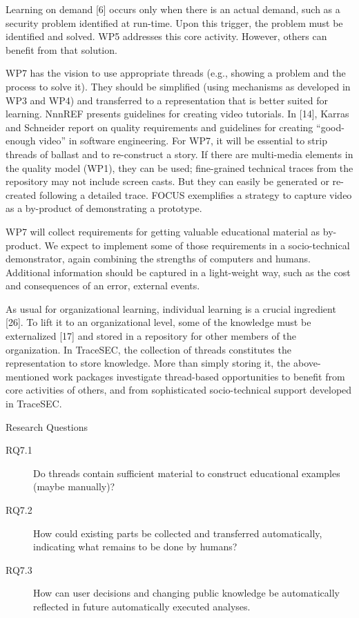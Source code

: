 Learning on demand [6] occurs only when there is an actual demand, such as a security problem identified at run-time. Upon this trigger, the problem must be identified and solved. WP5 addresses this core activity. However, others can benefit from that solution.

WP7 has the vision to use appropriate threads (e.g., showing a problem and the process to solve it). They should be simplified (using mechanisms as developed in WP3 and WP4) and transferred to a representation that is better suited for learning. NnnREF presents guidelines for creating video tutorials. In [14], Karras and Schneider report on quality requirements and guidelines for creating “good-enough video” in software engineering. For WP7, it will be essential to strip threads of ballast and to re-construct a story. If there are multi-media elements in the quality model (WP1), they can be used; fine-grained technical traces from the repository may not include screen casts. But they can easily be generated or re-created following a detailed trace. FOCUS exemplifies a strategy to capture video as a by-product of demonstrating a prototype. 

WP7 will collect requirements for getting valuable educational material as by-product. We expect to implement some of those requirements in a socio-technical demonstrator, again combining the strengths of computers and humans. Additional information should be captured in a light-weight way, such as the cost and consequences of an error, external events.

As usual for organizational learning, individual learning is a crucial ingredient [26]. To lift it to an organizational level, some of the knowledge must be externalized [17] and stored in a repository for other members of the organization. In TraceSEC, the collection of threads constitutes the representation to store knowledge. More than simply storing it, the above-mentioned work packages investigate thread-based opportunities to benefit from core activities of others, and from sophisticated socio-technical support developed in TraceSEC.

Research Questions
\begin{description}
	\item[RQ7.1]	Do threads contain sufficient material to construct educational examples (maybe manually)?
	\item[RQ7.2]	How could existing parts be collected and transferred automatically, indicating what remains to be done by humans?
	\item[RQ7.3]	How can user decisions and changing public knowledge be automatically reflected in future automatically executed analyses.
\end{description}

